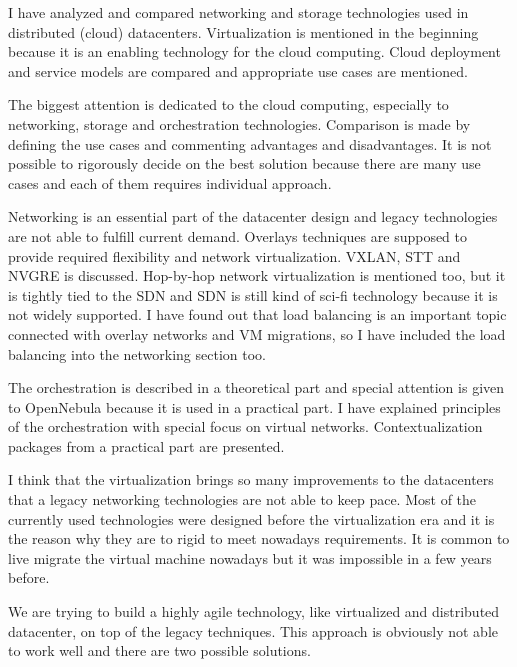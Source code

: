 
I have analyzed and compared networking and storage technologies used in distributed (cloud) datacenters. Virtualization is mentioned in the beginning because it is an enabling technology for the cloud computing. Cloud deployment and service models are compared and appropriate use cases are mentioned.

The biggest attention is dedicated to the cloud computing, especially to networking, storage and orchestration technologies. Comparison is made by defining the use cases and commenting advantages and disadvantages. It is not possible to rigorously decide on the best solution because there are many use cases and each of them requires individual approach.

Networking is an essential part of the datacenter design and legacy technologies are not able to fulfill current demand. Overlays techniques are supposed to provide required flexibility and network virtualization. \Ac{VXLAN}, \Ac{STT} and \Ac{NVGRE} is discussed. Hop-by-hop network virtualization is mentioned too, but it is tightly tied to the \Ac{SDN} and \Ac{SDN} is still kind of sci-fi technology because it is not widely supported.  
I have found out that load balancing is an important topic connected with overlay networks and \Ac{VM} migrations, so I have included the load balancing into the networking section too.


The orchestration is described in a theoretical part and special attention is given to OpenNebula because it is used in a practical part. I have explained principles of the orchestration with special focus on virtual networks. Contextualization packages from a practical part are presented.

I think that the virtualization brings so many improvements to the datacenters that a legacy networking technologies are not able to keep pace. Most of the currently used technologies were designed before the virtualization era and it is the reason why they are to rigid to meet nowadays requirements. It is common to live migrate the virtual machine nowadays but it was impossible in a few years before.

We are trying to build a highly agile technology, like virtualized and distributed datacenter, on top of the legacy techniques. This approach is obviously not able to work well and there are two possible solutions. 

